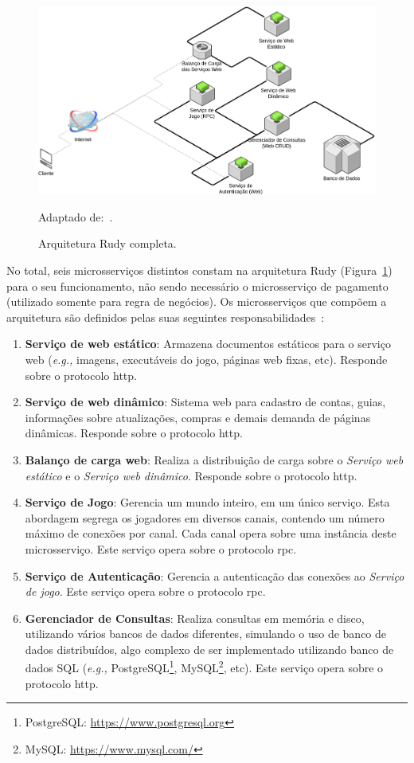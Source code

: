 \begin{figure}[htb!]
  \caption{Arquitetura Rudy completa.}
  \label{full_rudy}
  \includegraphics[width=\textwidth]{arquiteturas/full_rudy.png}
  \centering

  Adaptado de:~\cite{matthiasrudy2011}.
\end{figure}

No total, seis microsserviços distintos constam na arquitetura Rudy (Figura~\ref{full_rudy}) para o seu funcionamento, não sendo necessário o microsserviço de pagamento (utilizado somente para regra de negócios).
%
Os microsserviços que compõem a arquitetura são definidos pelas suas seguintes responsabilidades~\cite{matthiasrudy2011}:

\begin{enumerate}
  \item \textbf{Serviço de web estático}: Armazena documentos estáticos para o serviço web (\textit{e.g., }imagens, executáveis do jogo, páginas web fixas, etc). Responde sobre o protocolo \ac{http}.
  \item \textbf{Serviço de web dinâmico}: Sistema web para cadastro de contas, guias, informações sobre atualizações, compras e demais demanda de páginas dinâmicas. Responde sobre o protocolo \ac{http}.
  \item \textbf{Balanço de carga web}: Realiza a distribuição de carga sobre o \textit{Serviço web estático} e o \textit{Serviço web dinâmico}. Responde sobre o protocolo \ac{http}.
  \item \textbf{Serviço de Jogo}: Gerencia um mundo inteiro, em um único serviço. Esta abordagem segrega os jogadores em diversos canais, contendo um número máximo de conexões por canal. Cada canal opera sobre uma instância deste microsserviço. Este serviço opera sobre o protocolo \ac{rpc}.
  \item \textbf{Serviço de Autenticação}: Gerencia a autenticação das conexões ao \textit{Serviço de jogo}. Este serviço opera sobre o protocolo \ac{rpc}.
  \item \textbf{Gerenciador de Consultas}: Realiza consultas em memória e disco, utilizando vários bancos de dados diferentes, simulando o uso de banco de dados distribuídos, algo complexo de ser implementado utilizando banco de dados SQL (\textit{e.g.,} PostgreSQL\footnote{PostgreSQL: \url{https://www.postgresql.org}}, MySQL\footnote{MySQL: \url{https://www.mysql.com/}}, etc). Este serviço opera sobre o protocolo \ac{http}.
\end{enumerate}



